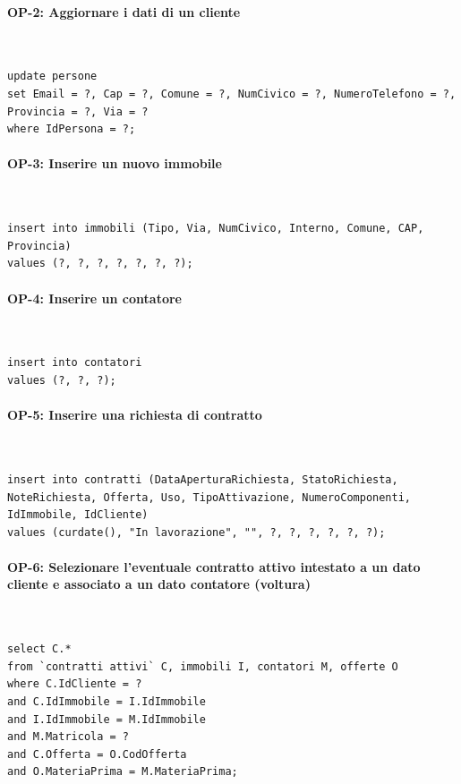 \documentclass[a4paper,12pt]{report}
\begin{document}
\paragraph{OP-2: Aggiornare i dati di un cliente}\mbox{}\\
\begin{lstlisting}
update persone
set Email = ?, Cap = ?, Comune = ?, NumCivico = ?, NumeroTelefono = ?, Provincia = ?, Via = ?
where IdPersona = ?;
\end{lstlisting}
    
\paragraph{OP-3: Inserire un nuovo immobile}\mbox{}\\
\begin{lstlisting}
insert into immobili (Tipo, Via, NumCivico, Interno, Comune, CAP, Provincia)
values (?, ?, ?, ?, ?, ?, ?);
\end{lstlisting}
    
\paragraph{OP-4: Inserire un contatore}\mbox{}\\
\begin{lstlisting}
insert into contatori
values (?, ?, ?);
\end{lstlisting}

\paragraph{OP-5: Inserire una richiesta di contratto}\mbox{}\\
\begin{lstlisting}
insert into contratti (DataAperturaRichiesta, StatoRichiesta, NoteRichiesta, Offerta, Uso, TipoAttivazione, NumeroComponenti, IdImmobile, IdCliente)
values (curdate(), "In lavorazione", "", ?, ?, ?, ?, ?, ?);
\end{lstlisting}

\paragraph{OP-6: Selezionare l'eventuale contratto attivo intestato a un dato cliente e associato a un dato contatore (voltura)}\mbox{}\\
\begin{lstlisting}
select C.*
from `contratti attivi` C, immobili I, contatori M, offerte O
where C.IdCliente = ?
and C.IdImmobile = I.IdImmobile
and I.IdImmobile = M.IdImmobile
and M.Matricola = ?
and C.Offerta = O.CodOfferta
and O.MateriaPrima = M.MateriaPrima;
\end{lstlisting}
\end{document}
